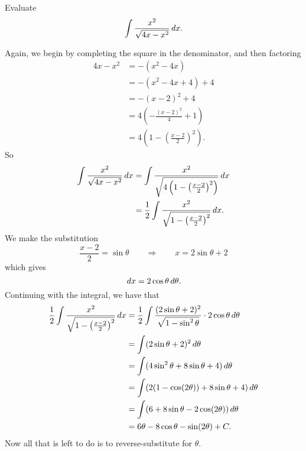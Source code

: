 \documentclass[]{ximera}
\begin{document}
\begin{instructorNotes}

\end{instructorNotes}







\begin{problem}
Evaluate
	\[
	\int \frac{x^2}{\sqrt{4x-x^2}} \,d x.
	\]
	\begin{freeResponse}
	Again, we begin by completing the square in the denominator, and then factoring
		\begin{align*}
		4x-x^2 &= -(x^2-4x)  \\
		&= -(x^2-4x+4) + 4  \\
		&= -(x-2)^2 + 4  \\
		&= 4 \left( - \frac{(x-2)^2}{4} + 1 \right)  \\
		&= 4 \left( 1 - \left( \frac{x-2}{2} \right)^2 \right).
		\end{align*}
	So
		\begin{align*}
		\int \frac{x^2}{\sqrt{4x-x^2}} \,d x &= \int \frac{x^2}{\sqrt{4 \left( 1 - \left( \frac{x-2}{2} \right)^2 \right)}} \,d x  \\
		&= \frac{1}{2} \int \frac{x^2}{\sqrt{1 - \left( \frac{x-2}{2} \right)^2}} \,d x.
		\end{align*}
	We make the substitution
		\begin{equation}\label{substitution2}
		\frac{x-2}{2} = \sin \theta	\qquad	\Longrightarrow	\qquad	x = 2\sin \theta + 2
		\end{equation}
	which gives
		\[
		\,d x = 2 \cos \theta \,d \theta.
		\]
	Continuing with the integral, we have that
		\begin{align*}
		\frac{1}{2} \int \frac{x^2}{\sqrt{1 - \left( \frac{x-2}{2} \right)^2}} \,d x
		&= \frac{1}{2} \int \frac{(2 \sin \theta + 2)^2}{\sqrt{1 - \sin^2 \theta}} \cdot 2 \cos \theta \,d \theta  \\
		&= \int (2\sin \theta + 2)^2 \,d \theta  \\
		&= \int ( 4 \sin^2 \theta + 8 \sin \theta + 4) \,d \theta  \\
		&= \int (2(1-\cos(2\theta)) + 8\sin \theta + 4) \,d \theta  \\
		&= \int (6 + 8\sin \theta - 2\cos(2\theta)) \,d \theta  \\
		&= 6 \theta - 8 \cos \theta - \sin(2\theta) + C.
		\end{align*}
	Now all that is left to do is to reverse-substitute for $\theta$.  

\end{freeResponse}
\end{problem}
\end{document}

